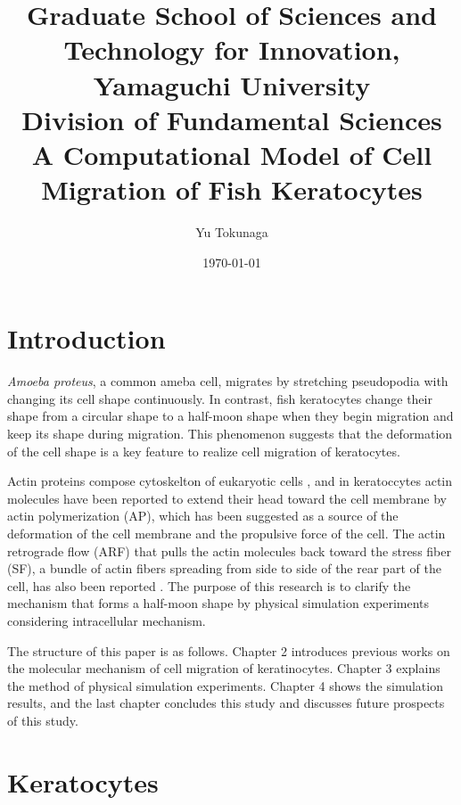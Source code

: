 \documentclass[a4paper,12pt, oneside]{book}
\title{\Large Graduate School of Sciences and Technology for Innovation, Yamaguchi University\\[1cm]
Division of Fundamental Sciences\\[3cm]
\huge A Computational Model of Cell Migration of Fish Keratocytes\\[5cm]
}
\author{Yu Tokunaga}
\date{\Large \today}
\begin{document}
\maketitle
\setcounter{page}{1}
\tableofcontents
\chapter{Introduction}
\setcounter{page}{1}
{\it Amoeba proteus},  a common ameba cell, migrates by stretching pseudopodia with changing its cell shape continuously.
In contrast, fish keratocytes change their shape from a circular shape to a half-moon shape when they begin migration and keep its shape during migration.
This phenomenon suggests that the deformation of the cell shape is a key feature to realize cell migration of keratocytes.

Actin proteins compose cytoskelton of eukaryotic cells \cite{svitkina1997analysis}, and in keratoccytes actin molecules have been reported to extend their head toward the cell membrane by actin polymerization (AP), which has been suggested as a source of the deformation of the cell membrane and the propulsive force of the cell.
The actin retrograde flow (ARF) that pulls the actin molecules back toward the stress fiber (SF), a bundle of actin fibers spreading from side to side of the rear part of the cell, has also been reported \cite{nakashima2015molecular}.
The purpose of this research is to clarify the mechanism that forms a half-moon shape by physical simulation experiments considering intracellular mechanism.

The structure of this paper is as follows.
Chapter 2 introduces previous works on the molecular mechanism of cell migration of keratinocytes.
Chapter 3 explains the  method of physical simulation experiments.
Chapter 4 shows the simulation results, and the last chapter concludes this study and discusses future prospects of this study.

\chapter{Keratocytes}
\end{document}
